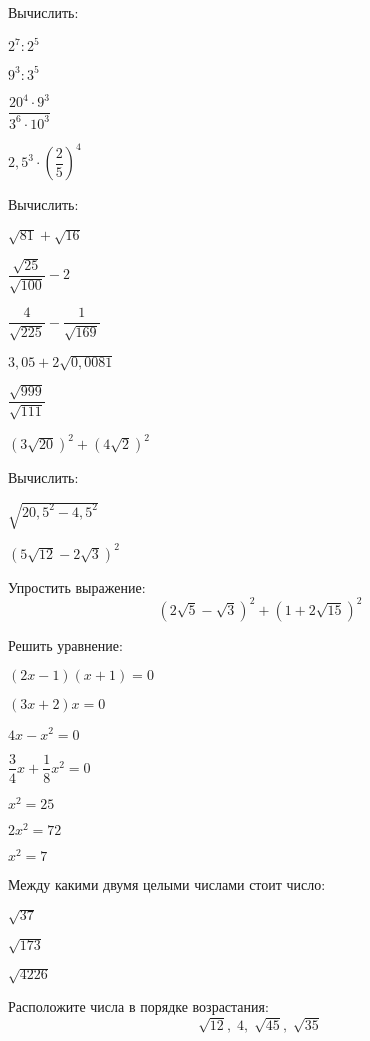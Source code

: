 %
%
\begin{exam}
	\begin{listofex}
		\item Вычислить:
		\begin{enumcols}[itemcolumns=3]
			\item \( 2^7:2^5 \)
			\item \( 9^3:3^5 \)
			\item \( \dfrac{20^4\cdot9^3}{3^6\cdot10^3} \)
			\item \( 2,5^3\cdot\left( \dfrac{2}{5} \right)^4 \)
		\end{enumcols}
		\item Вычислить:
		\begin{enumcols}[itemcolumns=3]
			\item \( \sqrt{81}+\sqrt{16} \)
			\item \( \dfrac{\sqrt{25}}{\sqrt{100}}-2 \)
			\item \( \dfrac{4}{\sqrt{225}}-\dfrac{1}{\sqrt{169}} \)
			\item \( 3,05+2\sqrt{0,0081} \)
			\item \( \dfrac{\sqrt{999}}{\sqrt{111}} \)
			\item \( (3\sqrt{20})^2+(4\sqrt{2})^2 \)
		\end{enumcols}
		\item Вычислить:
		\begin{enumcols}[itemcolumns=2]
			\item \( \sqrt{20,5^2-4,5^2} \)
			\item \( (5\sqrt{12}-2\sqrt{3})^2 \)
		\end{enumcols}
		\item Упростить выражение:
		\[ (2\sqrt{5}-\sqrt{3})^2+(1+2\sqrt{15})^2 \]
		\item Решить уравнение:
		\begin{enumcols}[itemcolumns=3]
			\item \( (2x-1)(x+1)=0 \)
			\item \( (3x+2)x=0 \)
			\item \( 4x-x^2=0 \)
			\item \( \dfrac{3}{4}x+\dfrac{1}{8}x^2=0 \)
			\item \( x^2=25 \)
			\item \( 2x^2=72 \)
			\item \( x^2=7 \)
		\end{enumcols}
		\item Между какими двумя целыми числами стоит число:
		\begin{enumcols}[itemcolumns=3]
			\item \( \sqrt{37} \)
			\item \( \sqrt{173} \)
			\item \( \sqrt{4226} \)
		\end{enumcols}
		\item Расположите числа в порядке возрастания:
		\[ \sqrt{12},\;4,\;\sqrt{45},\;\sqrt{35} \]
	\end{listofex}
\end{exam}

